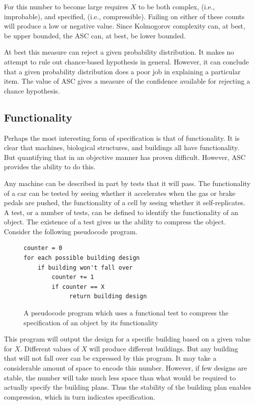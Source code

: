 For this number to become large requires $X$ to be both complex, (i.e., improbable), and specified, (i.e., compressible).
Failing on either of these counts will produce a low or negative value.
Since Kolmogorov complexity can, at best, be upper bounded, the ASC can, at best, be lower bounded.

At best this measure can reject a given probability distribution.
It makes no attempt to rule out chance-based hypothesis in general.
However, it can conclude that a given probability distribution does a poor job in explaining a particular item.
The value of ASC gives a measure of the confidence available for rejecting a chance hypothesis.

\subsection{Functionality}

Perhaps the most interesting form of specification is that of functionality.
It is clear that machines, biological structures, and buildings all have functionality.
But quantifying that in an objective manner has proven difficult.
However, ASC provides the ability to do this.

Any machine can be described in part by tests that it will pass.
The functionality of a car can be tested by seeing whether it accelerates when the gas or brake pedals are pushed,
the functionality of a cell by seeing whether it self-replicates.
A test, or a number of tests, can be defined to identify the functionality of an object. 
The existence of a test gives us the ability to compress the object.
Consider the following pseudocode program.

\begin{figure}[H]
\begin{mdframed}
\begin{verbatim}
counter = 0
for each possible building design
    if building won't fall over
        counter += 1
        if counter == X
             return building design
\end{verbatim} 
\end{mdframed}
\caption{A pseudocode program which uses a functional test to compress the specification of an object by its functionality}
\end{figure}
This program will output the design for a specific building based on a given value for $X$.
Different values of $X$ will produce different buildings.
But any building that will not fall over can be expressed by this program.
It may take a considerable amount of space to encode this number.
However, if few designs are stable, the number will take much less space than what would be required to actually specify the building plans.
Thus the stability of the building plan enables compression, which in turn indicates specification.

